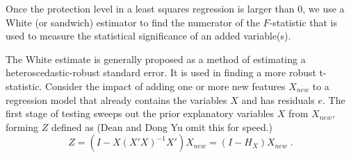 \documentclass[12pt]{article}
\begin{document}
 Once the protection level in a least squares regression is larger than 0, we
 use a White (or sandwich) estimator to find the numerator of the $F$-statistic
 that is used to measure the statistical significance of an added variable(s).

 The White estimate is generally proposed as a method of estimating a
 heteroscedastic-robust standard error.  It is used in finding a more robust
 t-statistic.  Consider the impact of adding one or more new features $X_{new}$
 to a regression model that already contains the variables $X$ and has residuals
 $e$. The first stage of testing sweeps out the prior explanatory variables $X$
 from $X_{new}$, forming $Z$ defined as (Dean and Dong Yu omit this for speed.)
\begin{displaymath}
  Z = (I-X(X'X)^{-1}X') X_{new} = (I-H_X) X_{new}  \;.
\end{displaymath}
\end{document}
